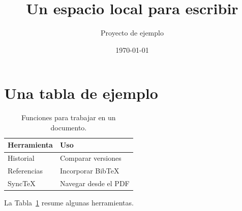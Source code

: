 \documentclass[11pt,a4paper]{article}
\title{Un espacio local para escribir}
\author{Proyecto de ejemplo}
\date{\today}
\begin{document}
\maketitle
\tableofcontents

\section{Una tabla de ejemplo}
\begin{table}[h]
\centering
\begin{tabular}{ll}
\hline
Herramienta & Uso \\
\hline
Historial & Comparar versiones \\
Referencias & Incorporar BibTeX \\
SyncTeX & Navegar desde el PDF \\
\hline
\end{tabular}
\caption{Funciones para trabajar en un documento.}\label{tab:funciones}
\end{table}
La Tabla~\ref{tab:funciones} resume algunas herramientas.


\end{document}
